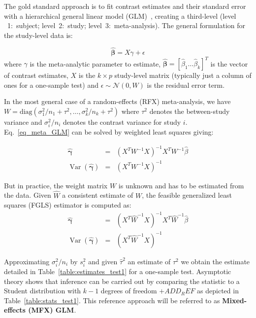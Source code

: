 \documentclass[preprint]{elsarticle}
\DeclareMathOperator{\Var}{Var}
\newcommand{\effectvector}{\hat\beta}
\newcommand{\effect}[1][i]{\effectvector_{#1}}
\newcommand{\vareffect}[1][i]{s^2_{#1}}
\newcommand{\nStudies}{k}
\newcommand{\metaanalyticeffect}{\gamma}
\newcommand{\varBetween}{\tau^2}
\newcommand{\estvarBetween}{\hat\tau^2}
\newcommand{\sampleSize}[1][i]{n_{#1}}
\newcommand{\varWithinCon}[1][i]{\sigma^2_{#1} / \sampleSize[#1]}
\newcommand{\transpose}{^T}
\renewcommand{\vec}[1]{\boldsymbol{\mathbf{#1}}}
\begin{document}
The gold standard approach is to fit contrast estimates and their standard error with a hierarchical general linear model (GLM)~\cite{Cummings2004}, creating a third-level (level ~1:~subject; level~2:~study; level~3:~meta-analysis). The general formulation for the study-level data is:

\begin{equation}
	\vec{\effectvector} = X \metaanalyticeffect + \epsilon
	\label{eq_meta_GLM}
\end{equation}
where $\metaanalyticeffect$ is the meta-analytic parameter to estimate, $\vec{\effectvector} = [\effect[1] \ldots \effect[\nStudies] ]\transpose$ is the vector of contrast estimates, $X$ is the $k\times p$ study-level matrix (typically just a column of ones for a one-sample test) and $\epsilon \sim \mathcal{N}(0,W)$ is the residual error term. 



In the most general case of a random-effects (RFX) meta-analysis, we have $W = \mathrm{diag}( \varWithinCon[1] + \varBetween, \ldots ,\varWithinCon[\nStudies] + \varBetween )$ where $\varBetween$ denotes the between-study variance and $\varWithinCon$ denotes the contrast variance for study $i$. Eq.~\eqref{eq_meta_GLM} can be solved by weighted least squares giving:

\begin{eqnarray}
	\vec{\hat \metaanalyticeffect}  &=& (X\transpose W^{-1} X)^{-1} X\transpose W^{-1} \effectvector \\
	\Var(\vec{\hat \metaanalyticeffect})  &=& (X\transpose W^{-1} X)^{-1}
	\label{eq_WLS}
\end{eqnarray}


But in practice, the weight matrix $W$ is unknown and has to be estimated from the data. Given $\hat W$ a consistent estimate of $W$, the feasible generalized least squares (FGLS) estimator is computed as:
\begin{eqnarray}
	\vec{\hat \metaanalyticeffect}  &=& (X\transpose \hat W^{-1} X)^{-1} X\transpose \hat W^{-1} \effectvector \\
	\Var(\vec{\hat \metaanalyticeffect})  &=& (X\transpose \hat W^{-1} X)^{-1}
	\label{eq_FGLS}
\end{eqnarray}

Approximating $\varWithinCon$ by $\vareffect$ and given $\estvarBetween$ an estimate of $\varBetween$ we obtain the estimate detailed in Table~\ref{table:estimates_test1} for a one-sample test. Asymptotic theory shows that inference can be carried out by comparing the statistic to a Student distribution with $k-1$ degrees of freedom $+ADD_REF$ as depicted in  Table~\ref{table:stats_test1}. This reference approach will be referred to as \textbf{Mixed-effects (MFX) GLM}.
\end{document}
